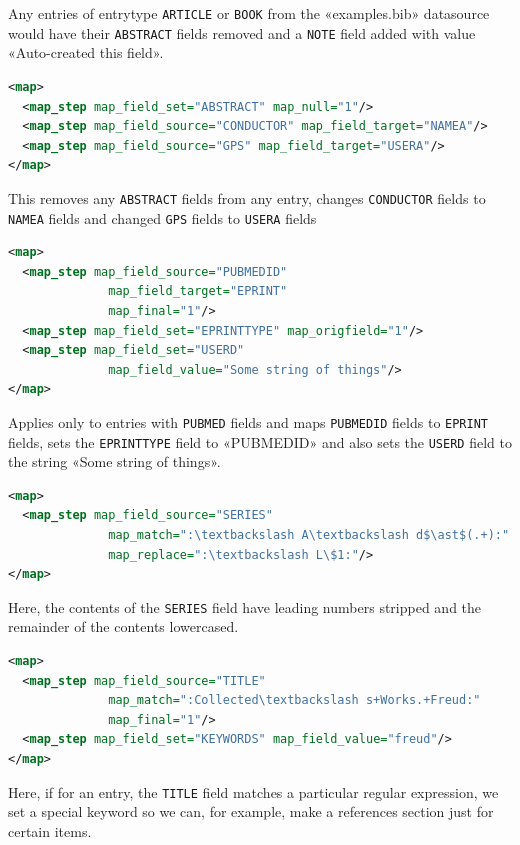 \documentclass{ltxdockit}
\begin{document}
\noindent Any entries of entrytype \verb+ARTICLE+ or \verb+BOOK+ from the
«examples.bib» datasource would have their \verb+ABSTRACT+
fields removed and a \verb+NOTE+ field added with value «Auto-created this field».

\begin{lstlisting}[language=xml,escapechar=:,mathescape=true]
<map>
  <map_step map_field_set="ABSTRACT" map_null="1"/>
  <map_step map_field_source="CONDUCTOR" map_field_target="NAMEA"/>
  <map_step map_field_source="GPS" map_field_target="USERA"/>
</map>
\end{lstlisting}

\noindent This removes any \verb+ABSTRACT+ fields from any entry, changes
\verb+CONDUCTOR+ fields to \verb+NAMEA+ fields and changed \verb+GPS+
fields to \verb+USERA+ fields

\begin{lstlisting}[language=xml,escapechar=:,mathescape=true]
<map>
  <map_step map_field_source="PUBMEDID"
              map_field_target="EPRINT"
              map_final="1"/>
  <map_step map_field_set="EPRINTTYPE" map_origfield="1"/>
  <map_step map_field_set="USERD"
              map_field_value="Some string of things"/>
</map>
\end{lstlisting}

\noindent Applies only to entries with \verb+PUBMED+ fields and maps
\verb+PUBMEDID+ fields to \verb+EPRINT+ fields, sets the \verb+EPRINTTYPE+
field to «PUBMEDID» and also sets the \verb+USERD+ field to the string
«Some string of things».

\begin{lstlisting}[language=xml,escapechar=:,mathescape=true]
<map>
  <map_step map_field_source="SERIES"
              map_match=":\textbackslash A\textbackslash d$\ast$(.+):"
              map_replace=":\textbackslash L\$1:"/>
</map>
\end{lstlisting}

\noindent Here, the contents of the \verb+SERIES+
field have leading numbers stripped and the remainder of the contents
lowercased.

\begin{lstlisting}[language=xml,escapechar=:,mathescape=true]
<map>
  <map_step map_field_source="TITLE"
              map_match=":Collected\textbackslash s+Works.+Freud:"
              map_final="1"/>
  <map_step map_field_set="KEYWORDS" map_field_value="freud"/>
</map>
\end{lstlisting}

\noindent Here, if for an entry, the \verb+TITLE+ field matches a
particular regular expression, we set a special keyword so we can, for
example, make a references section just for certain items.
\end{document}
